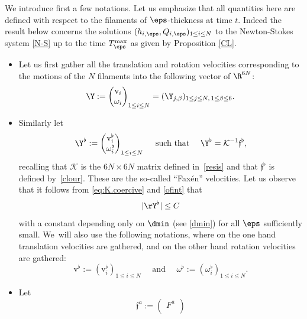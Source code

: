 We introduce first a few notations. Let us emphasize that all quantities here are defined with respect to the filaments of $\eps$-thickness at time $t$.
Indeed the result below concerns
the solutions
$(h_{i,\eps}, Q_{i,\eps})_{1 \leq i \leq N}$ to the Newton-Stokes system \eqref{N-S} up to the time $T^{\max}_\eps$ as given by Proposition \ref{CL}.
\begin{itemize}
\item
Let us first gather all the translation and rotation velocities corresponding to the motions of the $N$ filaments into the following vector of $\R^{6N}$:
\begin{equation} \label{rec2}
\Y :=
\begin{pmatrix}
\textrm{v}_i \\ \omega_i
\end{pmatrix}_{1 \leq i \leq N}
= (\Y_{j,\beta })_{1 \leq j \leq N, \, 1 \leq \beta \leq 6}.
\end{equation}
\item
Similarly let
\begin{equation} \label{beth}
\Y^\flat :=
\begin{pmatrix}
\textrm{v}^\flat_i \\
\omega^\flat_i
\end{pmatrix}_{1 \leq i \leq N}
\quad \text{
such that } \quad
\Y^\flat = \mathcal K^{-1}\mathfrak{f}^\flat,
\end{equation}
recalling that $\mathcal K$ is the $6N \times 6N$ matrix defined in~\eqref{resis} and that $\mathfrak{f}^\flat$ is defined by~\eqref{clour}.
These are the so-called ``Faxén'' velocities. Let us observe that
it follows from \eqref{eq:K.coercive} and
\eqref{ofint} that
\begin{equation} \label{est:Y}
|\rY^\flat| \leq C
\end{equation}
with a constant depending only on $\dmin$ (see \eqref{dmin}) for all $\eps$ sufficiently small.
We~will also use the following notations, where on the one hand translation velocities are gathered, and on the other hand rotation velocities are gathered:
\begin{equation} \label{fax-defv}
\textrm{v}^\flat := (\textrm{v}^\flat_i)_{1 \leq i \leq N} \quad \text{ and } \quad \omega^\flat := (\omega^\flat_i)_{1 \leq i \leq N}.
\end{equation}
\item Let
\begin{equation}
\mathfrak{f}^a
:=
\begin{pmatrix}
F^a \\

\end{pmatrix}
\end{equation}
\end{itemize}
